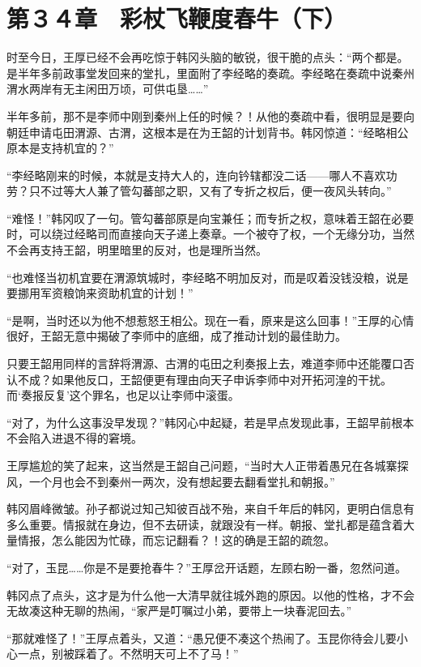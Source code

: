\section{第３４章　彩杖飞鞭度春牛（下）}

时至今日，王厚已经不会再吃惊于韩冈头脑的敏锐，很干脆的点头：“两个都是。是半年多前政事堂发回来的堂扎，里面附了李经略的奏疏。李经略在奏疏中说秦州渭水两岸有无主闲田万顷，可供屯垦……”

半年多前，那不是李师中刚到秦州上任的时候？！从他的奏疏中看，很明显是要向朝廷申请屯田渭源、古渭，这根本是在为王韶的计划背书。韩冈惊道：“经略相公原本是支持机宜的？”

“李经略刚来的时候，本就是支持大人的，连向钤辖都没二话——哪人不喜欢功劳？只不过等大人兼了管勾蕃部之职，又有了专折之权后，便一夜风头转向。”

“难怪！”韩冈叹了一句。管勾蕃部原是向宝兼任；而专折之权，意味着王韶在必要时，可以绕过经略司而直接向天子递上奏章。一个被夺了权，一个无缘分功，当然不会再支持王韶，明里暗里的反对，也是理所当然。

“也难怪当初机宜要在渭源筑城时，李经略不明加反对，而是叹着没钱没粮，说是要挪用军资粮饷来资助机宜的计划！”

“是啊，当时还以为他不想惹怒王相公。现在一看，原来是这么回事！”王厚的心情很好，王韶无意中揭破了李师中的底细，成了推动计划的最佳助力。

只要王韶用同样的言辞将渭源、古渭的屯田之利奏报上去，难道李师中还能覆口否认不成？如果他反口，王韶便更有理由向天子申诉李师中对开拓河湟的干扰。而‘奏报反复’这个罪名，也足以让李师中滚蛋。

“对了，为什么这事没早发现？”韩冈心中起疑，若是早点发现此事，王韶早前根本不会陷入进退不得的窘境。

王厚尴尬的笑了起来，这当然是王韶自己问题，“当时大人正带着愚兄在各城寨探风，一个月也会不到秦州一两次，没有想起要去翻看堂扎和朝报。”

韩冈眉峰微皱。孙子都说过知己知彼百战不殆，来自千年后的韩冈，更明白信息有多么重要。情报就在身边，但不去研读，就跟没有一样。朝报、堂扎都是蕴含着大量情报，怎么能因为忙碌，而忘记翻看？！这的确是王韶的疏忽。

“对了，玉昆……你是不是要抢春牛？”王厚岔开话题，左顾右盼一番，忽然问道。

韩冈点了点头，这才是为什么他一大清早就往城外跑的原因。以他的性格，才不会无故凑这种无聊的热闹，“家严是叮嘱过小弟，要带上一块春泥回去。”

“那就难怪了！”王厚点着头，又道：“愚兄便不凑这个热闹了。玉昆你待会儿要小心一点，别被踩着了。不然明天可上不了马！”

